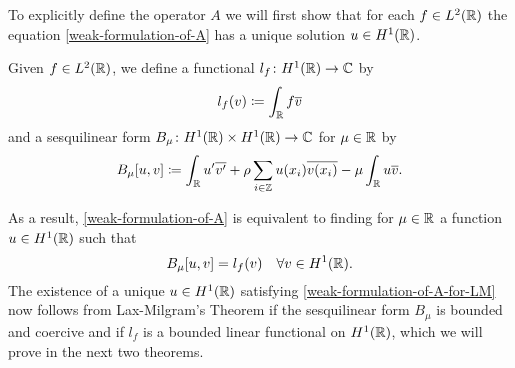 To explicitly define the operator $A$ we will first show that for each $f \in L^{2}(\mathbb{R})$ the equation \eqref{weak-formulation-of-A} has a unique solution $u \in H^{1}(\mathbb{R})$. 
\begin{definition}
	Given $f \in L^{2}(\mathbb{R})$, we define a functional $l_{f} \colon H^{1}(\mathbb{R}) \rightarrow \mathbb{C}$ by
	\[ l_{f}(v) \coloneqq \int_{\mathbb{R}} f \overline{v} \]
and a sesquilinear form $B_{\mu} \colon H^{1}(\mathbb{R}) \times H^{1}(\mathbb{R}) \rightarrow \mathbb{C}$ for $\mu \in \mathbb{R}$ by
	\[ B_{\mu}[u, v] \coloneqq \int_{\mathbb{R}} u' \overline{v'} + \rho \sum_{i \in \mathbb{Z}} u(x_{i}) \overline{v(x_{i})} - \mu \int_{\mathbb{R}} u \overline{v}. \]
\end{definition}
As a result, \eqref{weak-formulation-of-A} is equivalent to finding for $\mu \in \mathbb{R}$ a function $u \in H^{1}(\mathbb{R})$ such that
	\begin{equation}
		B_{\mu}[u, v] =  l_{f}(v) \quad \forall v \in H^{1}(\mathbb{R}). \label{weak-formulation-of-A-for-LM}
	\end{equation}
The existence of a unique $u \in H^{1}(\mathbb{R})$ satisfying \eqref{weak-formulation-of-A-for-LM} now follows from Lax-Milgram's Theorem if the sesquilinear form $B_{\mu}$ is bounded and coercive and if $l_{f}$ is a bounded linear functional on $H^{1}(\mathbb{R})$, which we will prove in the next two theorems.
